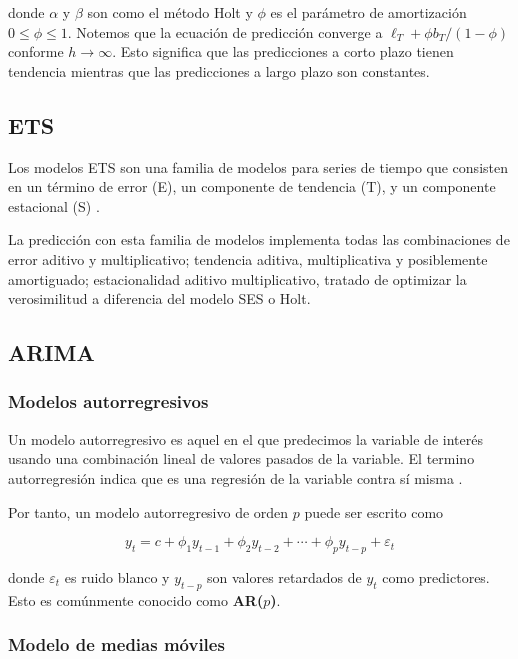 donde $\alpha$ y $\beta$ son como el método Holt y $\phi$ es el parámetro de amortización $0 \leq \phi \leq 1$.
Notemos que la ecuación de predicción converge a $\ell_{T}+\phi b_{T} /(1-\phi)$ conforme $h \rightarrow \infty$. Esto significa que las predicciones a corto plazo tienen tendencia mientras que las predicciones a largo plazo son constantes.

\subsection{ETS}

Los modelos ETS son una familia de modelos para series de tiempo que consisten en un término de error (E), un componente de tendencia (T), y un componente estacional (S) \cite{ETSModelsStatsmodels}.

La predicción con esta familia de modelos implementa todas las combinaciones de error aditivo y multiplicativo; tendencia aditiva, multiplicativa y posiblemente amortiguado; estacionalidad aditivo multiplicativo, tratado de optimizar la verosimilitud a diferencia del modelo SES o Holt.


\subsection{ARIMA}

\subsubsection{Modelos autorregresivos}

Un modelo autorregresivo es aquel en el que predecimos la variable de interés usando una combinación lineal de valores pasados de la variable. El termino autorregresión indica que es una regresión de la variable contra sí misma \cite{hyndmanForecastingPrinciplesPractice}.

Por tanto, un modelo autorregresivo de orden $p$ puede ser escrito como 

\[ y_{t}=c+\phi_{1} y_{t-1}+\phi_{2} y_{t-2}+\cdots+\phi_{p} y_{t-p}+\varepsilon_{t} \]

donde $\varepsilon_{t}$ es ruido blanco y $y_{t-p}$ son valores retardados de $y_t$ como predictores. Esto es comúnmente conocido como \textbf{AR($p$)}.

\subsubsection{Modelo de medias móviles}

